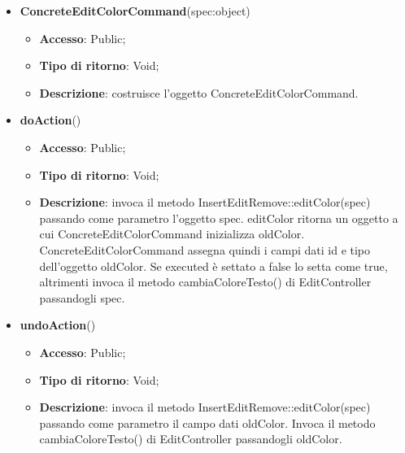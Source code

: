 {{{\begin{itemize}
\begin{itemize}
\begin{itemize}
\begin{itemize}
				\end{itemize}
			\end{itemize}
				\end{itemize}
				\end{itemize}
			\begin{itemize}
				\item \textbf{ConcreteEditColorCommand}(spec:object)
				\begin{itemize}
					\item \textbf{Accesso}: Public;
					\item \textbf{Tipo di ritorno}: Void;
					\item \textbf{Descrizione}: costruisce l’oggetto ConcreteEditColorCommand.
				\end{itemize}
				\item \textbf{doAction}()
				\begin{itemize}
					\item \textbf{Accesso}: Public;
					\item \textbf{Tipo di ritorno}: Void;
					\item \textbf{Descrizione}: invoca il metodo InsertEditRemove::editColor(spec) passando come parametro l'oggetto spec. editColor ritorna un oggetto a cui ConcreteEditColorCommand inizializza oldColor. ConcreteEditColorCommand assegna quindi i campi dati id e tipo dell'oggetto oldColor. Se executed è settato a false lo setta come true, altrimenti invoca il metodo cambiaColoreTesto() di EditController passandogli spec.
				\end{itemize}
				\item \textbf{undoAction}()
				\begin{itemize}
					\item \textbf{Accesso}: Public;
					\item \textbf{Tipo di ritorno}: Void;
					\item \textbf{Descrizione}: invoca il metodo InsertEditRemove::editColor(spec) passando come parametro il campo dati oldColor. Invoca il metodo cambiaColoreTesto() di EditController passandogli oldColor.
				\end{itemize}
			\end{itemize}
			}
			
}}
